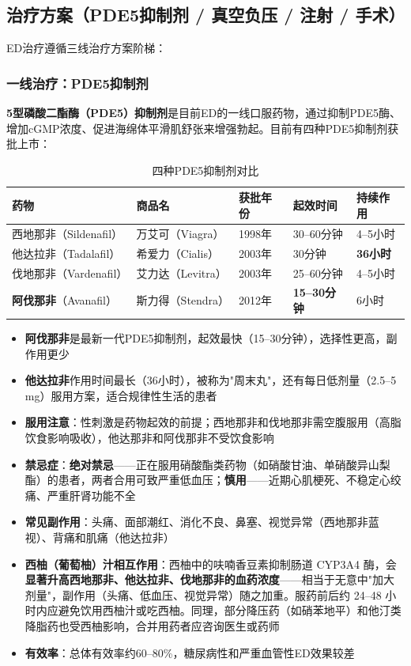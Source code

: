\subsection{治疗方案（PDE5抑制剂 / 真空负压 / 注射 / 手术）}

ED治疗遵循三线治疗方案阶梯：

\subsubsection{一线治疗：PDE5抑制剂}

\textbf{5型磷酸二酯酶（PDE5）抑制剂}是目前ED的一线口服药物，通过抑制PDE5酶、增加cGMP浓度、促进海绵体平滑肌舒张来增强勃起。目前有四种PDE5抑制剂获批上市：

\begin{table}[htbp]
\centering
\caption{四种PDE5抑制剂对比}
\label{tab:pde5_inhibitors}
\begin{tabularx}{\textwidth}{@{}lllll@{}}
    \toprule
    \textbf{药物} & \textbf{商品名} & \textbf{获批年份} & \textbf{起效时间} & \textbf{持续作用} \\
    \midrule
    西地那非（Sildenafil） & 万艾可（Viagra） & 1998年 & 30--60分钟 & 4--5小时 \\
    他达拉非（Tadalafil） & 希爱力（Cialis） & 2003年 & 30分钟 & \textbf{36小时} \\
    伐地那非（Vardenafil） & 艾力达（Levitra） & 2003年 & 25--60分钟 & 4--5小时 \\
    \textbf{阿伐那非}（Avanafil） & 斯力得（Stendra） & 2012年 & \textbf{15--30分钟} & 6小时 \\
    \bottomrule
\end{tabularx}
\end{table}

\begin{itemize}[leftmargin=2cm]
	\item \textbf{阿伐那非}是最新一代PDE5抑制剂，起效最快（15--30分钟），选择性更高，副作用更少
	\item \textbf{他达拉非}作用时间最长（36小时），被称为"周末丸"，还有每日低剂量（2.5--5 mg）服用方案，适合规律性生活的患者
	\item \textbf{服用注意}：性刺激是药物起效的前提；西地那非和伐地那非需空腹服用（高脂饮食影响吸收），他达那非和阿伐那非不受饮食影响
	\item \textbf{禁忌症}：\textbf{绝对禁忌}——正在服用硝酸酯类药物（如硝酸甘油、单硝酸异山梨酯）的患者，两者合用可致严重低血压；\textbf{慎用}——近期心肌梗死、不稳定心绞痛、严重肝肾功能不全
	\item \textbf{常见副作用}：头痛、面部潮红、消化不良、鼻塞、视觉异常（西地那非蓝视）、背痛和肌痛（他达拉非）
	\item \textbf{西柚（葡萄柚）汁相互作用}：西柚中的呋喃香豆素抑制肠道 CYP3A4 酶，会\textbf{显著升高西地那非、他达拉非、伐地那非的血药浓度}——相当于无意中"加大剂量"，副作用（头痛、低血压、视觉异常）随之加重。服药前后约 24--48 小时内应避免饮用西柚汁或吃西柚。同理，部分降压药（如硝苯地平）和他汀类降脂药也受西柚影响，合并用药者应咨询医生或药师
	\item \textbf{有效率}：总体有效率约60--80\%，糖尿病性和严重血管性ED效果较差
\end{itemize}

